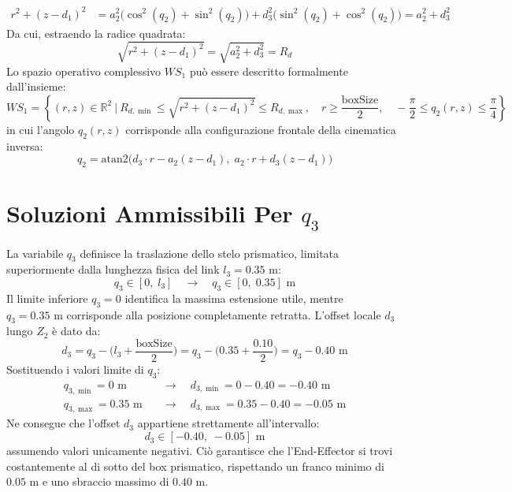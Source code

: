 \documentclass[11pt, a4paper]{report}
\begin{document}
\begin{align*}
  r^2 + (z - d_1)^2 &= a_2^2 \bigl(\cos^2(q_2) + \sin^2(q_2)\bigr) + d_3^2 \bigl(\sin^2(q_2) + \cos^2(q_2)\bigr) = a_2^2 + d_3^2
\end{align*}
Da cui, estraendo la radice quadrata:
\[
  \sqrt{r^2 + (z - d_1)^2} = \sqrt{a_2^2 + d_3^2} = R_d
\]
Lo spazio operativo complessivo $WS_1$ può essere descritto formalmente dall'insieme:
\[
  WS_1 = \left\{ (r, z) \in \mathbb{R}^2 \ \Big|\ R_{d,\min} \le \sqrt{r^2 + (z - d_1)^2} \le R_{d,\max}, \quad r \ge \frac{\text{boxSize}}{2}, \quad -\frac{\pi}{2} \le q_2(r, z) \le \frac{\pi}{4} \right\}
\]
in cui l'angolo $q_{2}(r, z)$ corrisponde alla configurazione frontale della cinematica inversa:
\[
  q_2 = \text{atan2}\biggl(d_{3} \cdot r - a_{2} (z - d_1), \; a_{2} \cdot r + d_{3} (z - d_1)\biggr)
\]

\section{Soluzioni Ammissibili Per $q_3$}
La variabile $q_{3}$ definisce la traslazione dello stelo prismatico, limitata superiormente dalla lunghezza fisica del link $l_3 = 0.35\text{ m}$:
\[
    q_3 \in [0, \; l_{3}] \quad\longrightarrow\quad q_{3} \in [0, \; 0.35]\text{ m}
\]
Il limite inferiore $q_3 = 0$ identifica la massima estensione utile, mentre $q_3 = 0.35\text{ m}$ corrisponde alla posizione completamente retratta. L'offset locale $d_{3}$ lungo $Z_{2}$ è dato da:
\[
    d_{3} = q_{3} - \biggl(l_3 + \frac{\text{boxSize}}{2}\biggr) = q_{3} - \biggl(0.35 + \frac{0.10}{2}\biggr) = q_{3} - 0.40\text{ m}
\]
Sostituendo i valori limite di $q_3$:
\begin{align*}
    q_{3, \min} = 0\text{ m} &\quad\longrightarrow\quad d_{3, \min} = 0 - 0.40 = -0.40\text{ m}\\
    q_{3, \max} = 0.35\text{ m} &\quad\longrightarrow\quad d_{3, \max} = 0.35 - 0.40 = -0.05\text{ m}
\end{align*}
Ne consegue che l'offset $d_3$ appartiene strettamente all'intervallo:
\[
    d_{3} \in [-0.40, \; -0.05]\text{ m}
\]
assumendo valori unicamente negativi. Ciò garantisce che l'End-Effector si trovi costantemente al di sotto del box prismatico, rispettando un franco minimo di $0.05\text{ m}$ e uno sbraccio massimo di $0.40\text{ m}$.
\end{document}
